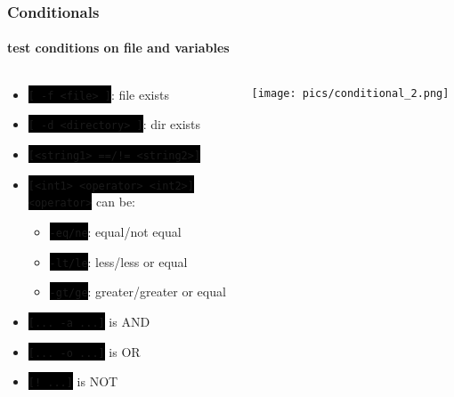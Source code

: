 \documentclass[unknownkeysallowed, 10pt, a4 paper, handout]{beamer}
\newcommand{\code}[1]{\colorbox{black}{\color{green}\texttt{#1}}}
\begin{document}
\begin{frame}
  \frametitle{Conditionals}
  \framesubtitle{test conditions on file and variables}

  \begin{block}{}
    \begin{columns}
      \begin{column}{0.60\textwidth}
        \small{
          \begin{itemize}
            \item \code{[ -f <file> ]}: file exists
            \item \code{[ -d <directory> ]}: dir exists
            \item \code{[<string1> ==/!= <string2>]}
            \item \code{[<int1> <operator> <int2>]} \\
            \code{<operator>} can be:
            \begin{itemize}
              \item \code{-eq/ne}: equal/not equal
              \item \code{-lt/le}: less/less or equal
              \item \code{-gt/ge}: greater/greater or equal
            \end{itemize}
          \end{itemize}
          \begin{itemize}
            \item \code{[... -a ...]} is AND
            \item \code{[... -o ...]} is OR
            \item \code{[! ...]} is NOT
          \end{itemize}
        }
      \end{column}
      \begin{column}{0.40\textwidth}
        \texttt{[image: pics/conditional\_2.png]}
      \end{column}
    \end{columns}
  \end{block}
\end{frame}
\end{document}
